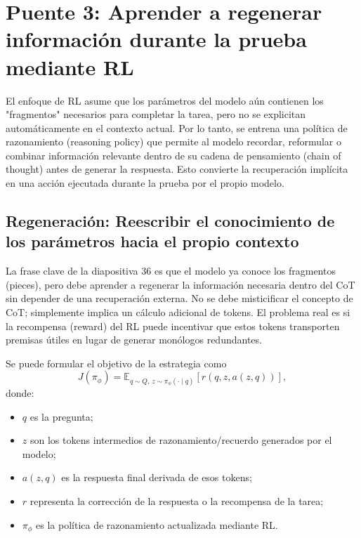 \section{Puente 3: Aprender a regenerar información durante la prueba mediante RL}

El enfoque de RL asume que los parámetros del modelo aún contienen los "fragmentos" necesarios para completar la tarea, pero no se explicitan automáticamente en el contexto actual. Por lo tanto, se entrena una política de razonamiento (reasoning policy) que permite al modelo recordar, reformular o combinar información relevante dentro de su cadena de pensamiento (chain of thought) antes de generar la respuesta. Esto convierte la recuperación implícita en una acción ejecutada durante la prueba por el propio modelo.

\subsection{Regeneración: Reescribir el conocimiento de los parámetros hacia el propio contexto}

La frase clave de la diapositiva 36 es que el modelo ya conoce los fragmentos (pieces), pero debe aprender a regenerar la información necesaria dentro del CoT sin depender de una recuperación externa. No se debe misticificar el concepto de CoT; simplemente implica un cálculo adicional de tokens. El problema real es si la recompensa (reward) del RL puede incentivar que estos tokens transporten premisas útiles en lugar de generar monólogos redundantes.


Se puede formular el objetivo de la estrategia como
$$
J(\pi_{\phi})=
\mathbb{E}_{q\sim Q,\,z\sim\pi_{\phi}(\cdot\mid q)}
\left[r\!\left(q,z,a(z,q)\right)\right],
$$
donde:
\begin{itemize}
  \item $q$ es la pregunta;
  \item $z$ son los tokens intermedios de razonamiento/recuerdo generados por el modelo;
  \item $a(z,q)$ es la respuesta final derivada de esos tokens;
  \item $r$ representa la corrección de la respuesta o la recompensa de la tarea;
  \item $\pi_{\phi}$ es la política de razonamiento actualizada mediante RL.
\end{itemize}

